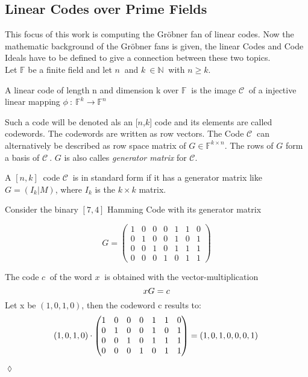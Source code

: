    

\newpage

\subsection{Linear Codes over Prime Fields}
\label{subsec:linearcodes}
This focus of this work is computing the Gröbner fan of linear codes. Now the mathematic background of the Gröbner fans is given, the linear Codes and Code Ideals have to be defined to give a connection between these two topics.\\ 
Let $\mathbb{F}$ be a finite field and let $n~$ and $k~\in \mathbb{N}~$ with $n\geq k$.
\begin{env_definition}
\cite{dueckjournal} A linear code of length n and dimension k over $\mathbb{F}~$ is the image $\mathcal{C}~$ of a injective linear mapping $\phi~:~\mathbb{F}^{k} \rightarrow \mathbb{F}^{n}  $
\end{env_definition} 
Such a code will be denoted als an [$n$,$k$] code and its elements are called codewords. The codewords are written 
as row vectors. The Code $\mathcal{C}~$ can alternatively be described as row space matrix of $G \in \mathbb{F}^{k \times n}$. The rows of $G$ form a basis of $\mathcal{C}~$.
$G$ is also calles \textit{generator matrix} for $\mathcal{C}$.

\begin{env_definition}
\cite{dueckjournal}
A $[n,k]~$ code $\mathcal{C}~$ is in standard form if it has a generator matrix like $G = (I_{k}| M)$, where $I_{k}$ is the $k \times k$ matrix.
\end{env_definition}


\begin{env_example}\normalfont
Consider the binary $[7,4]$ Hamming Code with its generator matrix

\[
G =
\begin{pmatrix}
1 & 0 & 0 & 0 & 1 & 1 & 0 \\ 
0 & 1 & 0 & 0 & 1 & 0 & 1 \\  
0 & 0 & 1 & 0 & 1 & 1 & 1 \\ 
0 & 0 & 0 & 1 & 0 & 1 & 1
\end{pmatrix} 
\]

The code $c~$ of the word $x~$ is obtained with the vector-multiplication
\[
     xG = c \\
 \]
 Let x be $\left(1,0,1,0\right)$, then the codeword c results to:
 \[
      \left(1,0,1,0\right) \cdot \begin{pmatrix}
      1 & 0 & 0 & 0 & 1 & 1 & 0 \\ 
      0 & 1 & 0 & 0 & 1 & 0 & 1 \\  
      0 & 0 & 1 & 0 & 1 & 1 & 1 \\ 
      0 & 0 & 0 & 1 & 0 & 1 & 1
      \end{pmatrix}   = \left(1,0,1,0,0,0,1\right) \\
  \]
\begin{flushright}
$\lozenge$
\end{flushright} 

\end{env_example}

